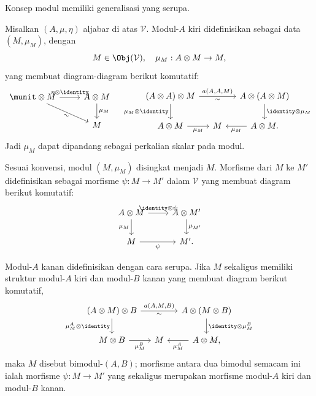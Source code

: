 Konsep modul memiliki generalisasi yang serupa.

\begin{definisi}[Modul]\label{def:module-algebra}
	Misalkan $(A,\mu,\eta)$ aljabar di atas $\mathcal{V}$. Modul-$A$ kiri
	didefinisikan sebagai data $(M,\mu_M)$, dengan
	\[ M \in \Obj(\mathcal{V}), \quad \mu_M: A \otimes M \to M, \]
	yang membuat diagram-diagram berikut komutatif:
	\[\begin{tikzcd}
		\munit \otimes M \arrow[r, "{\eta \otimes \identity}"] \arrow[rd, "\sim"' sloped] & A \otimes M \arrow[d, "{\mu_M}"] \\
		& M
	\end{tikzcd} \quad \begin{tikzcd}[column sep=small]
		(A \otimes A) \otimes M \arrow[rr, "{a(A, A, M)}", "\sim"'] \arrow[d, "{\mu_M \otimes \identity}"'] & & A \otimes (A \otimes M) \arrow[d, "{\identity \otimes \mu_M}"] \\
		A \otimes M \arrow[r, "{\mu_M}"'] & M & A \otimes M \arrow[l, "{\mu_M}"] .
	\end{tikzcd}\]
	Jadi $\mu_M$ dapat dipandang sebagai perkalian skalar pada modul.
	
	Sesuai konvensi, modul $(M,\mu_M)$ disingkat menjadi $M$. Morfisme dari $M$
	ke $M'$ didefinisikan sebagai morfisme $\psi:M\to M'$ dalam $\mathcal{V}$
	yang membuat diagram berikut komutatif:
	\[\begin{tikzcd}
		A \otimes M \arrow[d, "{\mu_M}"'] \arrow[r, "{\identity \otimes \psi}"] & A \otimes M' \arrow[d, "{\mu_{M'}}"] \\
		M \arrow[r, "\psi"'] & M' .
	\end{tikzcd}\]
	
	Modul-$A$ kanan didefinisikan dengan cara serupa. Jika $M$ sekaligus memiliki
	struktur modul-$A$ kiri dan modul-$B$ kanan yang membuat diagram berikut
	komutatif,
	\[\begin{tikzcd}[column sep=small]
		(A \otimes M) \otimes B \arrow[rr, "{a(A, M, B)}", "\sim"'] \arrow[d, "{\mu_M^A \otimes \identity}"'] & & A \otimes (M \otimes B) \arrow[d, "{\identity \otimes \mu_M^B}"] \\
		M \otimes B \arrow[r, "{\mu_M^B}"'] & M & A \otimes M , \arrow[l, "{\mu_M^A}"]
	\end{tikzcd}\]
	maka $M$ disebut bimodul-$(A,B)$; morfisme antara dua bimodul semacam ini
	ialah morfisme $\psi:M\to M'$ yang sekaligus merupakan morfisme modul-$A$
	kiri dan modul-$B$ kanan.
\end{definisi}

